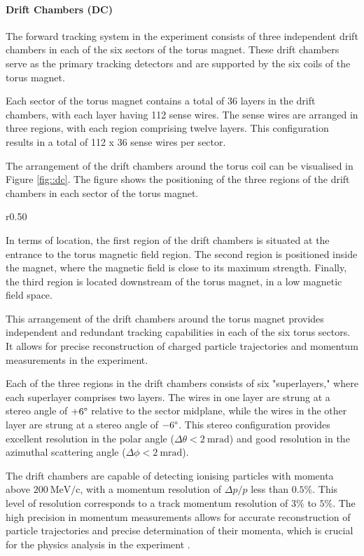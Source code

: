 \paragraph{Drift Chambers (DC)}
\label{par::dc}
    The forward tracking system in the experiment consists of three independent drift chambers in each of the six sectors of the torus magnet.
    These drift chambers serve as the primary tracking detectors and are supported by the six coils of the torus magnet.

    Each sector of the torus magnet contains a total of 36 layers in the drift chambers, with each layer having 112 sense wires.
    The sense wires are arranged in three regions, with each region comprising twelve layers.
    This configuration results in a total of 112 x 36 sense wires per sector.

    The arrangement of the drift chambers around the torus coil can be visualised in Figure \ref{fig::dc}.
    The figure shows the positioning of the three regions of the drift chambers in each sector of the torus magnet.

    \begin{wrapfigure}{r}{0.50\textwidth}
        \centering{}
        \caption[DC]{Drift Chambers render.
        Each of the DC regions are denoted as R1, R2, and R3 in the figure.
        Source: \hyperlink{https://www.jlab.org/physics/hall-b/clas12}{CLAS12 wiki}.}
        \label{fig::dc}
    \end{wrapfigure}

    In terms of location, the first region of the drift chambers is situated at the entrance to the torus magnetic field region.
    The second region is positioned inside the magnet, where the magnetic field is close to its maximum strength.
    Finally, the third region is located downstream of the torus magnet, in a low magnetic field space.

    This arrangement of the drift chambers around the torus magnet provides independent and redundant tracking capabilities in each of the six torus sectors.
    It allows for precise reconstruction of charged particle trajectories and momentum measurements in the experiment.

    Each of the three regions in the drift chambers consists of six "superlayers," where each superlayer comprises two layers.
    The wires in one layer are strung at a stereo angle of $+6\degree$ relative to the sector midplane, while the wires in the other layer are strung at a stereo angle of $-6\degree$.
    This stereo configuration provides excellent resolution in the polar angle ($\Delta\theta < 2 ~\text{mrad}$) and good resolution in the azimuthal scattering angle ($\Delta\phi < 2 ~\text{mrad}$).

    The drift chambers are capable of detecting ionising particles with momenta above $200 ~\text{MeV}/\text{c}$, with a momentum resolution of $\Delta p/p$ less than $0.5\%$. This level of resolution corresponds to a track momentum resolution of $3\%$ to $5\%$.
    The high precision in momentum measurements allows for accurate reconstruction of particle trajectories and precise determination of their momenta, which is crucial for the physics analysis in the experiment \cite{mestayer2020}.
